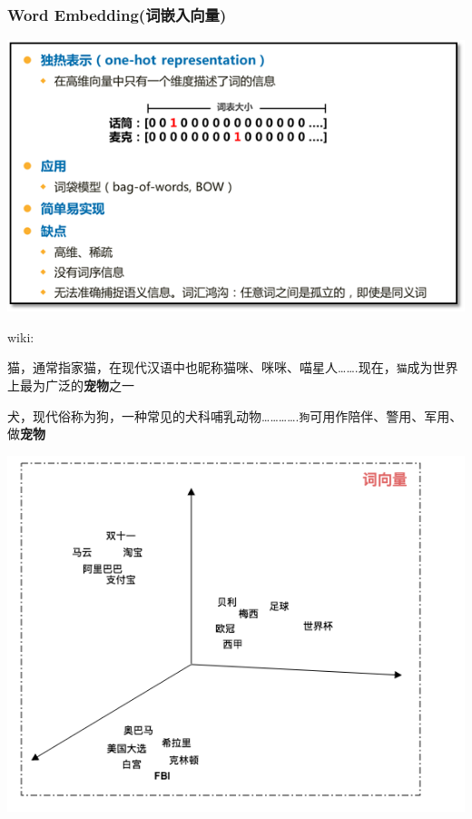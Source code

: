 \documentclass[11pt]{article}
\makeatletter
\def\maxwidth{\ifdim\Gin@nat@width>\linewidth\linewidth
    \else\Gin@nat@width\fi}
\let\Oldincludegraphics\includegraphics
\renewcommand{\includegraphics}[1]{\Oldincludegraphics[width=.8\maxwidth]{#1}}
\makeatother
\begin{document}
    \hypertarget{word-embeddingux8bcdux5d4cux5165ux5411ux91cf}{%
\subsubsection{Word
Embedding(词嵌入向量)}\label{word-embeddingux8bcdux5d4cux5165ux5411ux91cf}}

\includegraphics{img/one-hot.png}

    wiki:

猫，通常指家猫，在现代汉语中也昵称猫咪、咪咪、喵星人\ldots{}\ldots{}.现在，\texttt{猫}成为世界上最为广泛的\textbf{宠物}之一

犬，现代俗称为狗，一种常见的犬科哺乳动物\ldots{}\ldots{}\ldots{}\ldots{}.\texttt{狗}可用作陪伴、警用、军用、做\textbf{宠物}

\includegraphics{img/wordspace.png}
\end{document}
